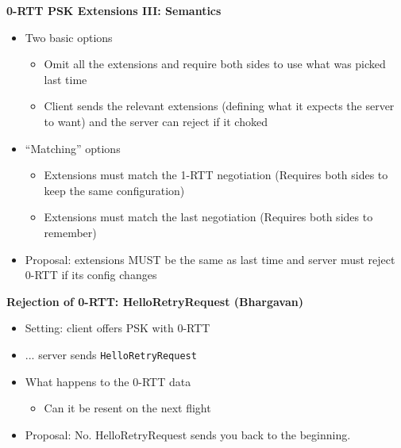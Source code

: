 \documentclass[helvetica]{seminar}
\newcommand{\heading}[1]{%
  \begin{center} 
    \large\bf 
    #1 
  \end{center} 
  \vspace{.4 in}}
\begin{document}
\begin{slide}
\heading{0-RTT PSK Extensions III: Semantics}

\vspace{-2ex}
\begin{itemize}
\item Two basic options
  \begin{itemize}
  \item Omit all the extensions and require both sides to use what was picked last time
  \item Client sends the relevant extensions (defining what it expects the server to want)
    and the server can reject if it choked
  \end{itemize}

\item ``Matching'' options
  \begin{itemize}
  \item Extensions must match the 1-RTT negotiation (Requires both sides to keep the same configuration)
  \item Extensions must match the last negotiation (Requires both sides to remember)
  \end{itemize}

\item Proposal: extensions MUST be the same as last time and server must reject 0-RTT if its config changes
\end{itemize}

\end{slide}


\begin{slide}
\heading{Rejection of 0-RTT: HelloRetryRequest (Bhargavan)}

\begin{itemize}
\item Setting: client offers PSK with 0-RTT
\item ... server sends \verb^HelloRetryRequest^
\item What happens to the 0-RTT data
  \begin{itemize}
  \item Can it be resent on the next flight
  \end{itemize}

\item Proposal: No. HelloRetryRequest sends you back to the beginning.
\end{itemize}
\end{slide}
\end{document}
